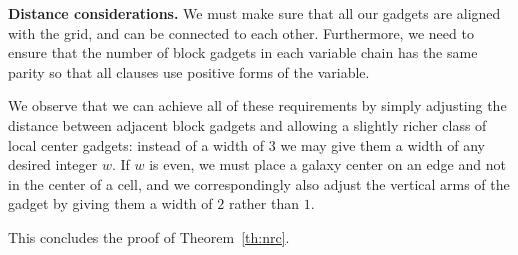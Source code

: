 \textbf{Distance considerations.}
We must make sure that all our gadgets are aligned with the grid, and can be connected to each other. Furthermore, we need to ensure that the number of block gadgets in each variable chain
has the same parity so that all clauses use positive forms of the variable.

We observe that we can achieve all of these requirements by simply adjusting the distance between adjacent block gadgets and allowing a slightly richer class of local center gadgets: instead of a width of $3$ we may give them a width of any desired integer $w$. If $w$ is even, we must place a galaxy center on an edge and not in the center of a cell, and we correspondingly also adjust the vertical arms of the gadget by giving them a width of $2$ rather than $1$.

This concludes the proof of Theorem~\ref{th:nrc}.
%










